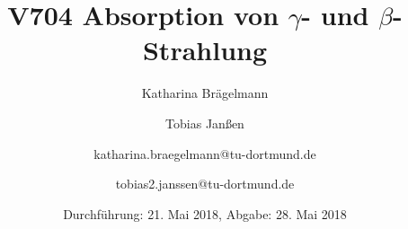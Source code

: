 
\title{V704 Absorption von $\gamma$- und $\beta$-Strahlung}
\author{Katharina Brägelmann \and Tobias Janßen \and katharina.braegelmann@tu-dortmund.de \and tobias2.janssen@tu-dortmund.de}
\date{Durchführung: 21. Mai 2018, Abgabe: 28. Mai 2018}
\maketitle

\tableofcontents
